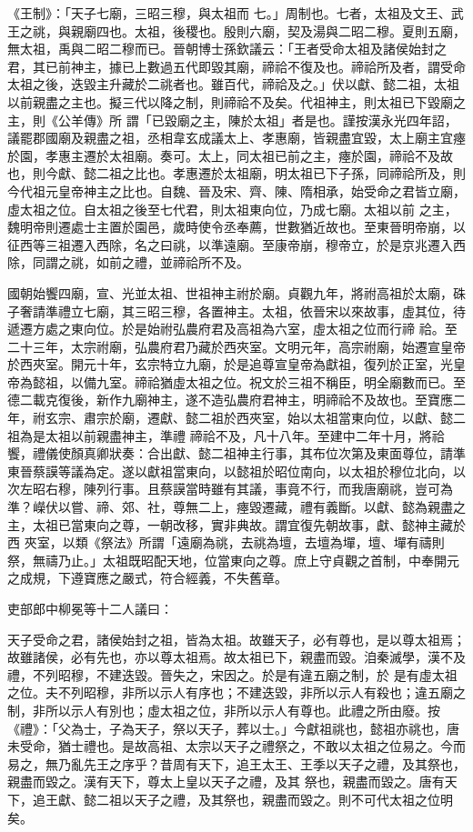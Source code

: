 \begin{pinyinscope}
 《王制》：「天子七廟，三昭三穆，與太祖而
 七。」周制也。七者，太祖及文王、武王之祧，與親廟四也。太祖，後稷也。殷則六廟，契及湯與二昭二穆。夏則五廟，無太祖，禹與二昭二穆而已。晉朝博士孫欽議云：「王者受命太祖及諸侯始封之君，其已前神主，據已上數過五代即毀其廟，禘祫不復及也。禘祫所及者，謂受命太祖之後，迭毀主升藏於二祧者也。雖百代，禘祫及之。」伏以獻、懿二祖，太祖以前親盡之主也。擬三代以降之制，則禘祫不及矣。代祖神主，則太祖已下毀廟之主，則《公羊傳》所
 謂「已毀廟之主，陳於太祖」者是也。謹按漢永光四年詔，議罷郡國廟及親盡之祖，丞相韋玄成議太上、孝惠廟，皆親盡宜毀，太上廟主宜瘞於園，孝惠主遷於太祖廟。奏可。太上，同太祖已前之主，瘞於園，禘祫不及故也，則今獻、懿二祖之比也。孝惠遷於太祖廟，明太祖已下子孫，同禘祫所及，則今代祖元皇帝神主之比也。自魏、晉及宋、齊、陳、隋相承，始受命之君皆立廟，虛太祖之位。自太祖之後至七代君，則太祖東向位，乃成七廟。太祖以前
 之主，魏明帝則遷處士主置於園邑，歲時使令丞奉薦，世數猶近故也。至東晉明帝崩，以征西等三祖遷入西除，名之曰祧，以準遠廟。至康帝崩，穆帝立，於是京兆遷入西除，同謂之祧，如前之禮，並禘祫所不及。



 國朝始饗四廟，宣、光並太祖、世祖神主祔於廟。貞觀九年，將祔高祖於太廟，硃子奢請準禮立七廟，其三昭三穆，各置神主。太祖，依晉宋以來故事，虛其位，待遞遷方處之東向位。於是始祔弘農府君及高祖為六室，虛太祖之位而行禘
 祫。至二十三年，太宗祔廟，弘農府君乃藏於西夾室。文明元年，高宗祔廟，始遷宣皇帝於西夾室。開元十年，玄宗特立九廟，於是追尊宣皇帝為獻祖，復列於正室，光皇帝為懿祖，以備九室。禘祫猶虛太祖之位。祝文於三祖不稱臣，明全廟數而已。至德二載克復後，新作九廟神主，遂不造弘農府君神主，明禘祫不及故也。至寶應二年，祔玄宗、肅宗於廟，遷獻、懿二祖於西夾室，始以太祖當東向位，以獻、懿二祖為是太祖以前親盡神主，準禮
 禘祫不及，凡十八年。至建中二年十月，將祫饗，禮儀使顏真卿狀奏：合出獻、懿二祖神主行事，其布位次第及東面尊位，請準東晉蔡謨等議為定。遂以獻祖當東向，以懿祖於昭位南向，以太祖於穆位北向，以次左昭右穆，陳列行事。且蔡謨當時雖有其議，事竟不行，而我唐廟祧，豈可為準？嶸伏以嘗、禘、郊、社，尊無二上，瘞毀遷藏，禮有義斷。以獻、懿為親盡之主，太祖已當東向之尊，一朝改移，實非典故。謂宜復先朝故事，獻、懿神主藏於西
 夾室，以類《祭法》所謂「遠廟為祧，去祧為壇，去壇為墠，壇、墠有禱則祭，無禱乃止。」太祖既昭配天地，位當東向之尊。庶上守貞觀之首制，中奉開元之成規，下遵寶應之嚴式，符合經義，不失舊章。



 吏部郎中柳冕等十二人議曰：



 天子受命之君，諸侯始封之祖，皆為太祖。故雖天子，必有尊也，是以尊太祖焉；故雖諸侯，必有先也，亦以尊太祖焉。故太祖已下，親盡而毀。洎秦滅學，漢不及禮，不列昭穆，不建迭毀。晉失之，宋因之。於是有違五廟之制，於
 是有虛太祖之位。夫不列昭穆，非所以示人有序也；不建迭毀，非所以示人有殺也；違五廟之制，非所以示人有別也；虛太祖之位，非所以示人有尊也。此禮之所由廢。按《禮》：「父為士，子為天子，祭以天子，葬以士。」今獻祖祧也，懿祖亦祧也，唐未受命，猶士禮也。是故高祖、太宗以天子之禮祭之，不敢以太祖之位易之。今而易之，無乃亂先王之序乎？昔周有天下，追王太王、王季以天子之禮，及其祭也，親盡而毀之。漢有天下，尊太上皇以天子之禮，及其
 祭也，親盡而毀之。唐有天下，追王獻、懿二祖以天子之禮，及其祭也，親盡而毀之。則不可代太祖之位明矣。




\end{pinyinscope}
